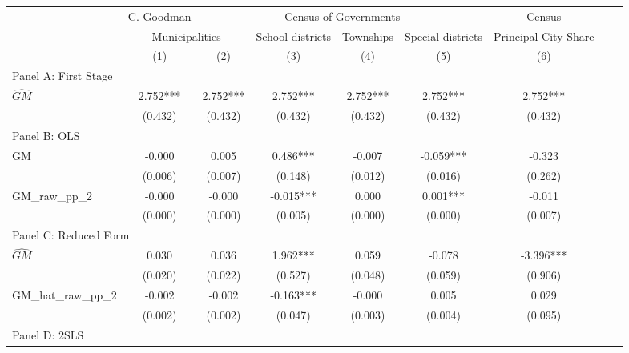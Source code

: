  \begin{tabular}{l*{8}{c}} \toprule
&\multicolumn{1}{c}{C. Goodman}&\multicolumn{4}{c}{Census of Governments}&\multicolumn{1}{c}{Census}\\\cmidrule(lr){2-2}\cmidrule(lr){3-6}\cmidrule(lr){7-7}
&\multicolumn{2}{c}{Municipalities}&\multicolumn{1}{c}{School districts}&\multicolumn{1}{c}{Townships}&\multicolumn{1}{c}{Special districts}&\multicolumn{1}{c}{Principal City Share}\\\cmidrule(lr){2-3}\cmidrule(lr){4-6}\cmidrule(lr){7-7}
&\multicolumn{1}{c}{(1)}&\multicolumn{1}{c}{(2)}&\multicolumn{1}{c}{(3)}&\multicolumn{1}{c}{(4)}&\multicolumn{1}{c}{(5)}&\multicolumn{1}{c}{(6)}\\
\cmidrule(lr){1-7}
\multicolumn{6}{l}{Panel A: First Stage}\\
\cmidrule(lr){1-7}
$\widehat{GM}$  &    2.752***&    2.752***&    2.752***&    2.752***&    2.752***&    2.752***\\
                &  (0.432)   &  (0.432)   &  (0.432)   &  (0.432)   &  (0.432)   &  (0.432)   \\
\cmidrule(lr){1-7}
\multicolumn{6}{l}{Panel B: OLS}\\
\cmidrule(lr){1-7}
GM              &   -0.000   &    0.005   &    0.486***&   -0.007   &   -0.059***&   -0.323   \\
                &  (0.006)   &  (0.007)   &  (0.148)   &  (0.012)   &  (0.016)   &  (0.262)   \\
\addlinespace
GM\_raw\_pp\_2     &   -0.000   &   -0.000   &   -0.015***&    0.000   &    0.001***&   -0.011   \\
                &  (0.000)   &  (0.000)   &  (0.005)   &  (0.000)   &  (0.000)   &  (0.007)   \\
\cmidrule(lr){1-7}
\multicolumn{6}{l}{Panel C: Reduced Form}\\
\cmidrule(lr){1-7}
$\widehat{GM}$  &    0.030   &    0.036   &    1.962***&    0.059   &   -0.078   &   -3.396***\\
                &  (0.020)   &  (0.022)   &  (0.527)   &  (0.048)   &  (0.059)   &  (0.906)   \\
\addlinespace
GM\_hat\_raw\_pp\_2 &   -0.002   &   -0.002   &   -0.163***&   -0.000   &    0.005   &    0.029   \\
                &  (0.002)   &  (0.002)   &  (0.047)   &  (0.003)   &  (0.004)   &  (0.095)   \\
\cmidrule(lr){1-7}
\multicolumn{6}{l}{Panel D: 2SLS}\\
\cmidrule(lr){1-7}

\end{tabular}
